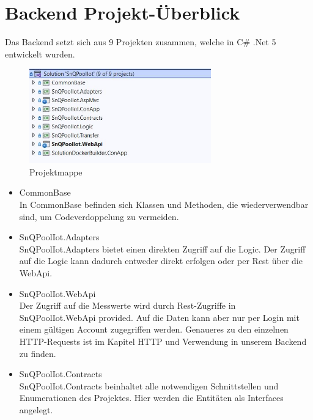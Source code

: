 \section{Backend Projekt-Überblick}

Das Backend setzt sich aus 9 Projekten zusammen, welche in C\# .Net 5 entwickelt wurden.


\begin{figure}[H]
    \centering
    \includegraphics[width=0.7\textwidth]{pics/Projektmappe.JPG}
    \caption{Projektmappe}
\end{figure}


\begin{itemize}
    \item CommonBase
    \\
    In CommonBase befinden sich Klassen und Methoden, die wiederverwendbar sind, um Codeverdoppelung zu vermeiden.
\end{itemize}


\begin{itemize}
    \item SnQPoolIot.Adapters
    \\
    SnQPoolIot.Adapters bietet einen direkten Zugriff auf die Logic.
Der Zugriff auf die Logic kann dadurch entweder direkt erfolgen oder per Rest über die WebApi.
\end{itemize}

\begin{itemize}
    \item SnQPoolIot.WebApi
    \\
    Der Zugriff auf die Messwerte wird durch Rest-Zugriffe in SnQPoolIot.WebApi provided.
    Auf die Daten kann aber nur per Login mit einem gültigen Account zugegriffen werden.
    Genaueres zu den einzelnen HTTP-Requests ist im Kapitel HTTP und Verwendung in unserem Backend zu finden.
\end{itemize}

\begin{itemize}
    \item SnQPoolIot.Contracts
    \\
    SnQPoolIot.Contracts beinhaltet alle notwendigen Schnittstellen und Enumerationen des Projektes.
    Hier werden die Entitäten als Interfaces angelegt.
\end{itemize}


